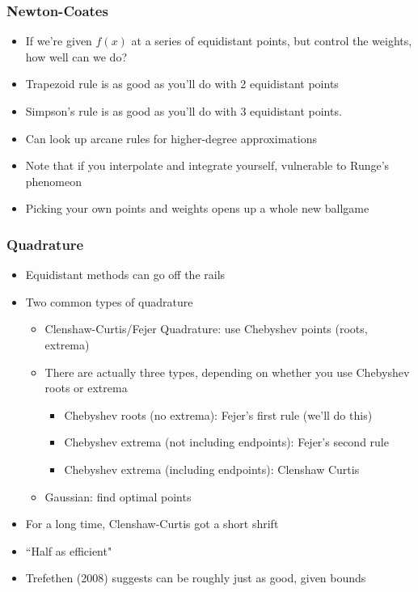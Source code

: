 \documentclass{beamer}
\begin{document}
\begin{frame}
\frametitle[alignment=center]{Newton-Coates}
\begin{itemize}
\item If we're given $f(x)$ at a series of equidistant points, but control the weights, how well can we do?
\bigskip
\item Trapezoid rule is as good as you'll do with 2 equidistant points
\bigskip
\item Simpson's rule is as good as you'll do with 3 equidistant points.
\bigskip
\item Can look up arcane rules for higher-degree approximations 
\bigskip
\item Note that if you interpolate and integrate yourself, vulnerable to Runge's phenomeon
\bigskip
\item Picking your own points and weights opens up a whole new ballgame
\end{itemize}
\end{frame}

\begin{frame}
\frametitle[alignment=center]{Quadrature}
\begin{itemize}
\item Equidistant methods can go off the rails
\smallskip
\item Two common types of quadrature
\smallskip
\begin{itemize}
\item Clenshaw-Curtis/Fejer Quadrature: use Chebyshev points (roots, extrema)
\smallskip
\item There are actually three types, depending on whether you use Chebyshev roots or extrema
\begin{itemize}
\item Chebyshev roots (no extrema):  Fejer's first rule (we'll do this)
\item Chebyshev extrema (not including endpoints): Fejer's second rule
\item Chebyshev extrema (including endpoints): Clenshaw Curtis
\end{itemize}
\smallskip
\item Gaussian: find optimal points
\smallskip
\end{itemize}
\item For a long time, Clenshaw-Curtis got a short shrift
\smallskip
\item ``Half as efficient"
\smallskip
\item Trefethen (2008) suggests can be roughly just as good, given bounds
\end{itemize}
\end{frame}
\end{document}
